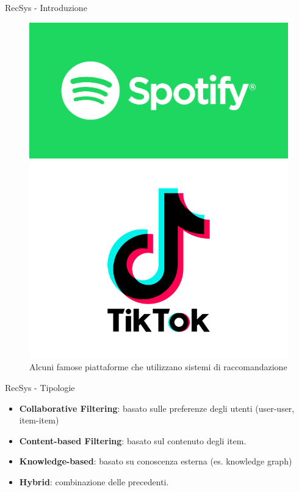 \begin{frame}{RecSys - Introduzione}
\begin{figure}[h!]
\begin{minipage}{0.15\textwidth}
    \end{minipage}\hfill
    \begin{minipage}{0.15\textwidth}
        \centering
        \includegraphics[width=\textwidth]{images/spotify.png}
    \end{minipage}\hfill
    \begin{minipage}{0.15\textwidth}
        \centering
        \includegraphics[width=\textwidth]{images/tiktok.png}
    \end{minipage}
    \caption{Alcuni famose piattaforme che utilizzano sistemi di raccomandazione}
\end{figure}
\end{frame}

\begin{frame}{RecSys - Tipologie}
\begin{itemize}
    \item \textbf{Collaborative Filtering}: basato sulle preferenze degli utenti (user-user, item-item)
    \item \textbf{Content-based Filtering}: basato sul contenuto degli item.
    \item \textbf{Knowledge-based}: basato su conoscenza esterna (es. knowledge graph)
    \item \textbf{Hybrid}: combinazione delle precedenti.
\end{itemize}
\end{frame}
